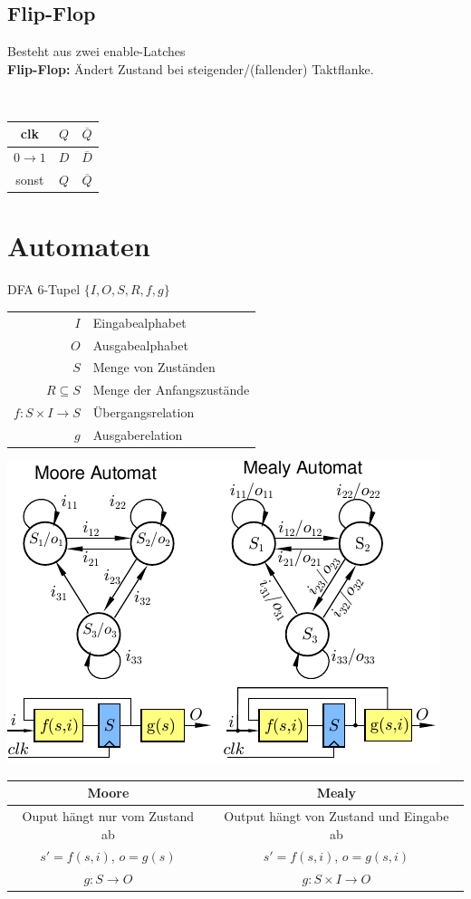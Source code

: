 \documentclass[6pt,a4paper]{scrartcl}
\renewcommand{\emph}[1]{\textsf{\textbf{#1}}}
\newcommand{\eset}[1]{\ensuremath{\bigl\{#1\bigr\}}}								%
\newcommand{\ol}[1]{\ensuremath{\overline{#1}}}									%
\newcommand{\ra}[0]{\ensuremath{\rightarrow}} 									%
\begin{document}
\begin{multicols*}{3}
	\subsection{Flip-Flop}
		\parbox{5cm}{
			Besteht aus zwei enable-Latches \\
			\emph{Flip-Flop:} Ändert Zustand bei steigender/(fallender) Taktflanke.\\
		}
		\parbox{.5cm}{\ }
		\parbox{2cm}{
			\begin{tabular}{c|c|c} clk & $Q$ & $\ol Q$ \\ \hline $0 \ra 1$ & $D$ & $\ol D$ \\ sonst & $Q$ & $\ol Q$ \end{tabular}
		}


\section{Automaten} %

DFA 6-Tupel $\eset{I, O, S, R, f, g}$ \\

\begin{tabular}{r | l} 
$I$ & Eingabealphabet \\
$O$ &  Ausgabealphabet \\
$S$ & Menge von Zuständen \\
$R \subseteq S$ &  Menge der Anfangszustände \\
$f: S \times I \ra S$  &  Übergangsrelation \\
$g$ & Ausgaberelation \\
\end{tabular}

\includegraphics{./img/ds/automaten.pdf}\\


\begin{tabular}{c | c}
 Moore & Mealy \\ \hline
 Ouput hängt nur vom Zustand ab & Output hängt von Zustand und Eingabe ab\\
 $s'=f(s,i)$, $o=g(s)$ &  $s'=f(s,i)$, $o=g(s,i)$ \\
 $g: S \ra O$ & $g: S \times I \ra O$
\end{tabular}

\end{multicols*}
\end{document}
